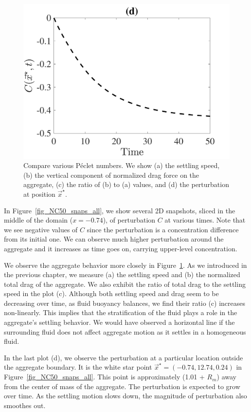 \begin{figure}[h]
\begin{center}
		\includegraphics[scale=0.35]{./figures/fig_NC50_bs_C_star}
	\caption{Compare various Péclet numbers. We show (a) the settling speed, (b) the vertical component of normalized drag force on the aggregate, (c) the ratio of (b) to (a) values, and (d) the perturbation at position $\vec{x}^{\star}$. }
	\label{fig_NC50_base_case_all}
\end{center}
\end{figure}
\par 
In Figure~\ref{fig_NC50_snaps_all}, we show several 2D snapshots, sliced in the middle of the domain ($x = -0.74$), of perturbation $C$ at various times. Note that we see negative values of $C$ since the perturbation is a concentration difference from its initial one. 
We can observe much higher perturbation around the aggregate and it increases as time goes on, carrying upper-level concentration. 
\par
We observe the aggregate behavior more closely in Figure~\ref{fig_NC50_base_case_all}. As we introduced in the previous chapter, we measure (a) the settling speed and (b) the normalized total drag of the aggregate. We also exhibit the ratio of total drag to the settling speed in the plot (c). Although both settling speed and drag seem to be decreasing over time, as fluid buoyancy balances, we find their ratio (c) increases non-linearly. This implies that the stratification of the fluid plays a role in the aggregate's settling behavior. 
We would have observed a horizontal line if the surrounding fluid does not affect aggregate motion as it settles in a homogeneous fluid. 
\par
In the last plot (d), we observe the perturbation at a particular location outside the aggregate boundary. It is the white star point $\vec{x}^{\star} = (-0.74, 12.74, 0.24)$ in Figure~\ref{fig_NC50_snaps_all}. This point is approximately (1.01 + $R_m$) away from the center of mass of the aggregate. The perturbation is expected to grow over time. As the settling motion slows down, the magnitude of perturbation also smoothes out. 
